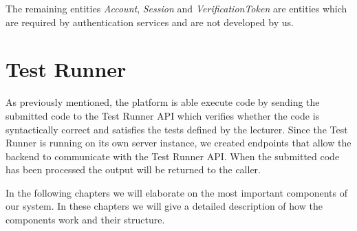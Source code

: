 The remaining entities \textit{Account}, \textit{Session} and \textit{VerificationToken} are entities which are required by authentication services and are not developed by us.

\section{Test Runner}
As previously mentioned, the platform is able execute code by sending the submitted code to the Test Runner API which verifies whether the code is syntactically correct and satisfies the tests defined by the lecturer.
Since the Test Runner is running on its own server instance, we created endpoints that allow the backend to communicate with the Test Runner API. When the submitted code has been processed the output will be returned to the caller.

In the following chapters we will elaborate on the most important components of our system. In these chapters we will give a detailed description of how the components work and their structure.